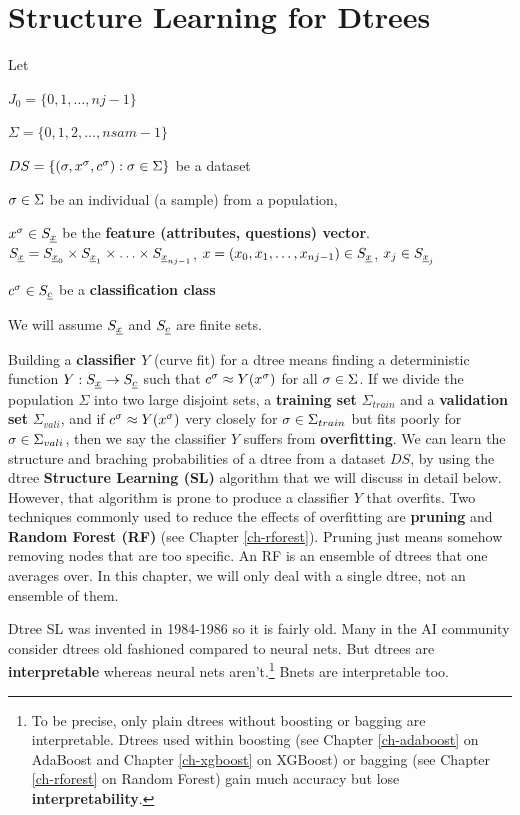 \section{Structure Learning for  Dtrees}\label{sec-dtree-sl}



Let

$J_0=\{0,1, \ldots, nj-1\}$

$\Sigma=\{0,1,2, \ldots,nsam-1\}$

$DS=\{(\sigma, x^\sigma, c^\sigma): \sigma\in \Sigma\}$ be a dataset

$\sigma\in \Sigma$ be an individual (a sample)
from a population, 

$x^\s\in S_\rvx$ be the {\bf
feature (attributes, questions) vector}.
$S_\rvx= S_{\rvx_0}\times S_{\rvx_1}
\times\ldots\times S_{\rvx_{nj-1}}$,
$x=(x_0, x_1, \ldots, x_{nj-1})\in S_\rvx$, 
$x_j\in S_{\rvx_j}$


$c^\s\in S_\rvc$ be a {\bf classification class}

We will
assume $S_\rvx$ and $S_\rvc$ are finite sets.

Building a {\bf classifier $Y$} 
(curve fit) for a dtree means
finding a deterministic
function $Y:S_\rvx\rarrow S_\rvc$ 
such that 
$c^\sigma \approx Y(x^\sigma)$
for all $\sigma\in \Sigma$.
If we divide
the population
$\Sigma$ 
into two large 
disjoint
sets, a {\bf training set} $\Sigma_{train}$
and a {\bf validation set} $\Sigma_{vali}$,
and if $c^\sigma \approx Y(x^\sigma)$ very closely
for $\sigma\in \Sigma_{train}$
but fits poorly
for $\sigma\in \Sigma_{vali}$,
then we say the classifier  $Y$
suffers from {\bf overfitting}.
We can learn the structure
and braching probabilities of a dtree from a dataset $DS$,
by using the
dtree {\bf Structure Learning (SL)}
algorithm that we will 
discuss in detail below. However,
that algorithm
is prone to produce
a classifier $Y$ that overfits.
Two techniques 
commonly used to 
reduce the effects of overfitting
are {\bf pruning}  and 
{\bf Random Forest (RF)}
(see Chapter \ref{ch-rforest}).
Pruning just means somehow
removing nodes that are
too specific. 
An RF is an ensemble of dtrees 
that one averages over.
In this chapter, we will only deal
with a single dtree,
not an ensemble of them. 

Dtree SL was invented in 1984-1986 so it
is fairly old.
Many in the AI
community 
consider dtrees old fashioned
compared to neural nets.
But dtrees 
are {\bf interpretable} whereas neural nets aren't.\footnote{
To be precise, only
plain dtrees without boosting or
 bagging
are interpretable.
Dtrees used within boosting
(see Chapter \ref{ch-adaboost} on AdaBoost
and
Chapter \ref{ch-xgboost} on XGBoost)
or bagging
(see Chapter \ref{ch-rforest} on Random Forest)
gain much
accuracy but lose
{\bf interpretability}.}
Bnets are interpretable too.


